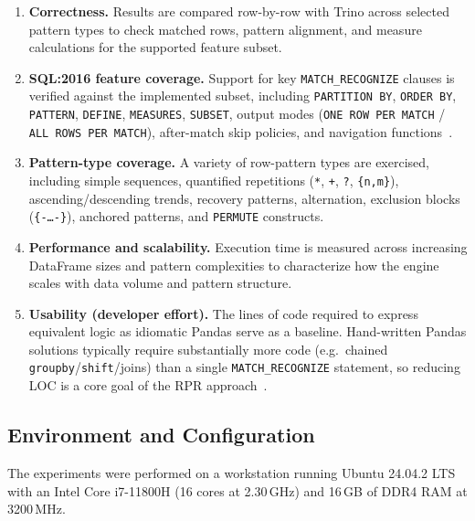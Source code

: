 \begin{enumerate}
  \item \textbf{Correctness.}
    Results are compared row-by-row with Trino across selected
    pattern types to check matched rows, pattern alignment, and
    measure calculations for the supported feature subset.

  \item \textbf{SQL:2016 feature coverage.}
    Support for key \texttt{MATCH\_RECOGNIZE} clauses is verified
    against the implemented subset, including \texttt{PARTITION~BY},
    \texttt{ORDER~BY},
    \texttt{PATTERN}, \texttt{DEFINE}, \texttt{MEASURES},
    \texttt{SUBSET}, output modes (\texttt{ONE~ROW~PER~MATCH} /
    \texttt{ALL~ROWS~PER~MATCH}), after-match skip policies, and
    navigation
    functions~\cite{iso2016,ISO2021,monierashraf2025rowmatch}.

  \item \textbf{Pattern-type coverage.}
    A variety of row-pattern types are exercised, including simple
    sequences, quantified repetitions
    (\texttt{*}, \texttt{+}, \texttt{?}, \texttt{\{n,m\}}),
    ascending/descending trends, recovery patterns, alternation,
    exclusion blocks (\texttt{\{-\ldots-\}}), anchored patterns,
    and \texttt{PERMUTE} constructs.

  \item \textbf{Performance and scalability.}
    Execution time is measured across increasing DataFrame sizes
    and pattern complexities to characterize how the engine scales
    with data volume and pattern structure.

  \item \textbf{Usability (developer effort).}
    The lines of code required to express equivalent logic as
    idiomatic Pandas serve as a baseline.  Hand-written Pandas
    solutions typically require substantially more code
    (e.g.\ chained \texttt{groupby}/\texttt{shift}/joins) than a
    single \texttt{MATCH\_RECOGNIZE} statement, so reducing LOC
    is a core goal of the RPR
    approach~\cite{iso2016,ISO2021,melton2017sqlrpr,Python_UDF}.
\end{enumerate}

\subsection{Environment and Configuration}
\label{subsec:eval-environment}

The experiments were performed on a workstation running Ubuntu
24.04.2 LTS with an Intel Core i7-11800H (16 cores at 2.30\,GHz)
and 16\,GB of DDR4 RAM at 3200\,MHz.

